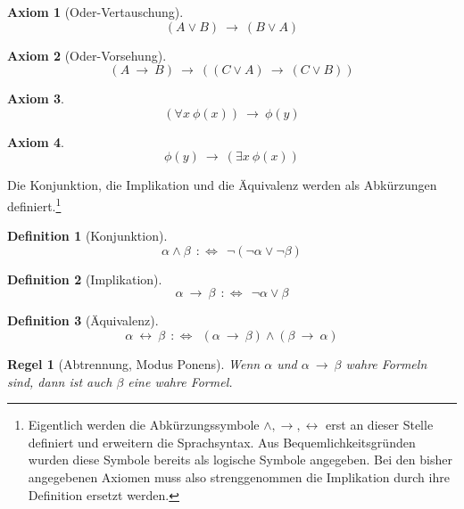 \documentclass[a4paper,german,10pt,twoside]{book}
\newtheorem{ax}{Axiom}
\newtheorem{defn}{Definition}
\newtheorem{rul}{Regel}
\newcommand{\defp}{\ :\Leftrightarrow \ }
\newcommand{\impl}{\ \rightarrow \ }
\newcommand{\equi}{\ \leftrightarrow \ }
\begin{document}
{\begin{ax}[Oder-Vertauschung]
$$(A \lor B) \impl (B \lor A)$$
\end{ax}

\begin{ax}[Oder-Vorsehung]
$$(A \impl B) \impl ((C \lor A) \impl (C \lor B))$$
\end{ax}

\begin{ax}
$$(\forall x~\phi(x)) \impl \phi(y)$$
\end{ax}

\begin{ax}
$$\phi(y) \impl (\exists x~\phi(x))$$
\end{ax}

Die Konjunktion, die Implikation und die {\"A}quivalenz werden als Abk{\"u}rzungen
definiert.\footnote{Eigentlich werden die Abk{\"u}rzungssymbole $\wedge, \rightarrow, \leftrightarrow$
erst an dieser Stelle definiert und erweitern die Sprachsyntax. Aus Bequemlichkeitsgr{\"u}nden wurden
diese Symbole bereits als logische Symbole angegeben. Bei den bisher angegebenen Axiomen muss also
strenggenommen die Implikation durch ihre Definition ersetzt werden.}

\begin{defn}[Konjunktion]
$$\alpha \land \beta \ \defp \ \neg(\neg\alpha \lor \neg\beta)$$
\end{defn}

\begin{defn}[Implikation]
$$\alpha \impl \beta \ \defp \ \neg\alpha \lor \beta$$
\end{defn}

\begin{defn}[{\"A}quivalenz]
$$\alpha \equi \beta \ \defp \ (\alpha \impl \beta) \land (\beta \impl \alpha)$$
\end{defn}

\begin{rul}[Abtrennung, Modus Ponens]
Wenn $\alpha$ und $\alpha \impl \beta$ wahre Formeln sind, dann ist auch $\beta$ eine wahre Formel.
\end{rul}

}
\end{document}
